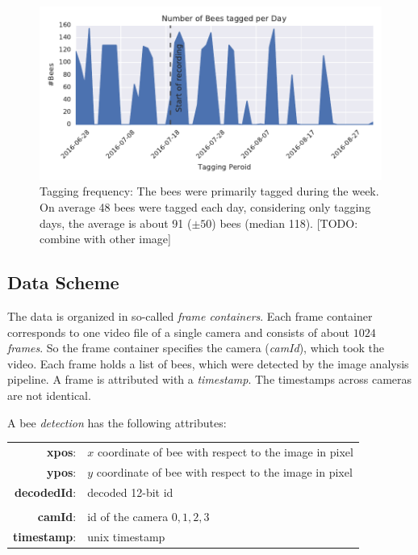 \begin{figure}[htb]
	\centering
	\includegraphics[width=1.0\textwidth]{Figures/tagging_period}
	\caption[Tagging frequency]{Tagging frequency: The bees were primarily tagged during the week. On average 48 bees were tagged each day, considering only tagging days, the average is about 91 ($\pm50$) bees (median 118). [TODO: combine with other image]}
	\label{fig:tagging}
\end{figure}




\clearpage
\subsection{Data Scheme}
\label{subsec:datascheme}
The data is organized in so-called \emph{frame containers}.
Each frame container corresponds to one video file of a single camera and consists of about $1024$ \emph{frames}. So the frame container specifies the camera (\emph{camId}), which took the video.
Each frame holds a list of bees, which were detected by the image analysis pipeline. A frame is attributed with a \emph{timestamp}. The timestamps across cameras are not identical.

A bee \emph{detection} has the following attributes:

\begin{table}[!h]
\centering
\begin{tabular}{rl}
\textbf{xpos}: & $x$ coordinate of bee with respect to the image in pixel \\
\textbf{ypos}: & $y$ coordinate of bee with respect to the image in pixel \\
\textbf{decodedId}: & decoded 12-bit id \\
\\
\textbf{camId}: & id of the camera ${0,1,2,3}$ \\
\textbf{timestamp}: & unix timestamp \\
\end{tabular}
\end{table}

